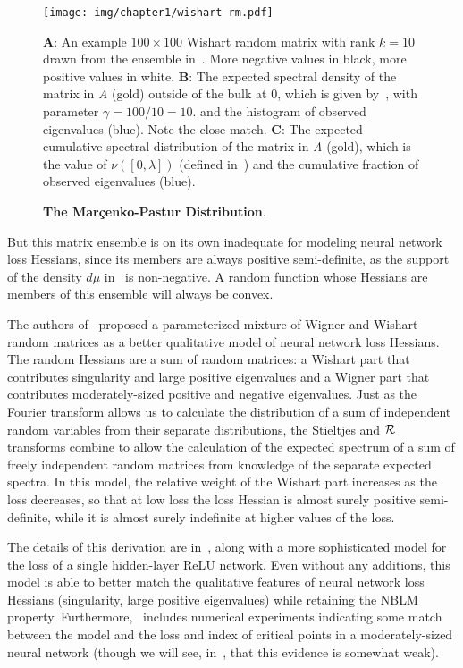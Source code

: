 \documentclass[../../thesis.tex]{subfiles}
\begin{document}
\begin{figure}[ht]
	\begin{center}
		\texttt{[image: img/chapter1/wishart-rm.pdf]}
	\end{center}
	\caption{\textbf{The Mar{\c c}enko-Pastur Distribution}.}%
	{\textbf{A}: An example $100\times100$ Wishart random matrix with rank $k=10$
		drawn from the ensemble in~.
		More negative values in black, more positive values in white.
	\textbf{B}: The expected spectral density of the matrix in \emph{A} (gold)
		outside of the bulk at $0$,
		which is given by~,
		with parameter $\gamma=100/10=10$.
		and the histogram of observed eigenvalues (blue). Note the close match.
	\textbf{C}: The expected cumulative spectral distribution
		of the matrix in \emph{A} (gold),
		which is the value of $\nu\left(\left[0, \lambda\right]\right)$
		(defined in~)
		and the cumulative fraction of observed eigenvalues (blue).}
\end{figure}

But this matrix ensemble is on its own inadequate
for modeling neural network loss Hessians,
since its members are always positive semi-definite,
as the support of the density $d\mu$
in~ is non-negative.
A random function whose Hessians are members of this ensemble
will always be convex.

The authors of~\cite{pennington2017}
proposed a parameterized mixture of Wigner and Wishart random matrices
as a better qualitative model of neural network loss Hessians.
The random Hessians are a sum of random matrices:
a Wishart part that contributes singularity
and large positive eigenvalues
and a Wigner part that contributes
moderately-sized positive and negative eigenvalues.
Just as the Fourier transform allows us to calculate
the distribution of a sum of independent random variables
from their separate distributions,
the Stieltjes and ${\mathcal{R}}$ transforms combine
to allow the calculation of the expected spectrum of a sum of
freely independent random matrices from knowledge of the separate expected spectra.
In this model, the relative weight of the Wishart part
increases as the loss decreases,
so that at low loss the loss Hessian is almost surely positive semi-definite,
while it is almost surely indefinite at higher values of the loss.

The details of this derivation are in~\cite{pennington2017},
along with a more sophisticated model
for the loss of a single hidden-layer ReLU network.
Even without any additions,
this model is able to better match the qualitative features of
neural network loss Hessians
(singularity, large positive eigenvalues)
while retaining the NBLM property.
Furthermore,~\cite{pennington2017}
includes numerical experiments indicating
some match between the model and the loss and index
of critical points in a moderately-sized neural network
(though we will see, in~,
that this evidence is somewhat weak).
\end{document}

